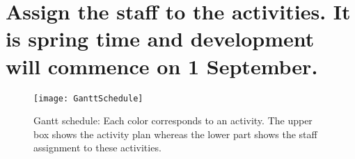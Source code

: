 \documentclass[Main]{subfiles}
\begin{document}
\section{Assign the staff to the activities. It is spring time and development will commence on 1 September.}
\begin{figure}[hbtp]
\centering
\texttt{[image: GanttSchedule]}
\caption{Gantt schedule: Each color corresponds to an activity. The upper box shows the activity plan whereas the lower part shows the staff assignment to these activities.}
\label{fig:ganttSchedule}
\end{figure}
\end{document}
